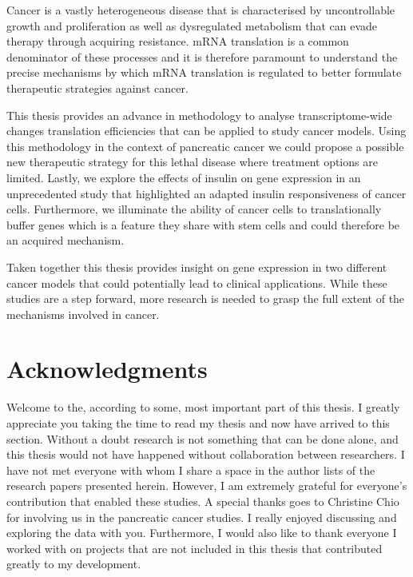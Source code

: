 \documentclass[12pt,openany]{book}
\begin{document}
Cancer is a vastly heterogeneous disease that is characterised by
uncontrollable growth and proliferation as well as dysregulated
metabolism that can evade therapy through acquiring resistance. mRNA
translation is a common denominator of these processes and it is
therefore paramount to understand the precise mechanisms by which mRNA
translation is regulated to better formulate therapeutic strategies
against cancer.

This thesis provides an advance in methodology to analyse
transcriptome-wide changes translation efficiencies that can be applied
to study cancer models. Using this methodology in the context of
pancreatic cancer we could propose a possible new therapeutic strategy
for this lethal disease where treatment options are limited. Lastly, we
explore the effects of insulin on gene expression in an unprecedented
study that highlighted an adapted insulin responsiveness of cancer
cells. Furthermore, we illuminate the ability of cancer cells to
translationally buffer genes which is a feature they share with stem
cells and could therefore be an acquired mechanism.

Taken together this thesis provides insight on gene expression in two
different cancer models that could potentially lead to clinical
applications. While these studies are a step forward, more research is
needed to grasp the full extent of the mechanisms involved in cancer.

\chapter*{Acknowledgments}\label{acknowledgments}

Welcome to the, according to some, most important part of this thesis. I
greatly appreciate you taking the time to read my thesis and now have
arrived to this section. Without a doubt research is not something that
can be done alone, and this thesis would not have happened without
collaboration between researchers. I have not met everyone with whom I
share a space in the author lists of the research papers presented
herein. However, I am extremely grateful for everyone's contribution
that enabled these studies. A special thanks goes to Christine Chio for
involving us in the pancreatic cancer studies. I really enjoyed
discussing and exploring the data with you. Furthermore, I would also
like to thank everyone I worked with on projects that are not included
in this thesis that contributed greatly to my development.
\end{document}
